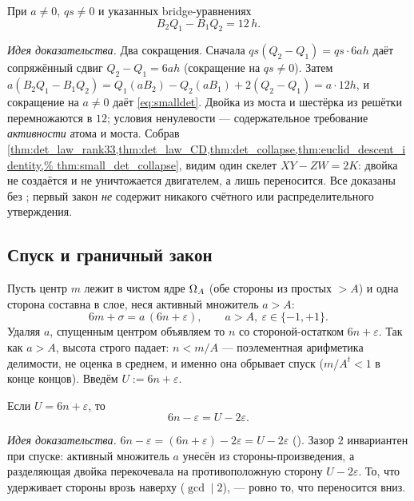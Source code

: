 \begin{theorem}\label{thm:small_det_collapse}
\green{} При $a\ne 0$, $qs\ne 0$ и указанных bridge-уравнениях
\begin{equation}\label{eq:smalldet}
B_2 Q_1-B_1 Q_2=12\,h.
\end{equation}
\end{theorem}

\emph{Идея доказательства.} Два сокращения. Сначала $qs(Q_2-Q_1)=qs\cdot 6ah$ даёт сопряжённый сдвиг
$Q_2-Q_1=6ah$ (сокращение на $qs\ne 0$). Затем
$a(B_2 Q_1-B_1 Q_2)=Q_1(aB_2)-Q_2(aB_1)+2(Q_2-Q_1)=a\cdot12h$, и сокращение на $a\ne 0$ даёт
\cref{eq:smalldet}. Двойка из моста и шестёрка из решётки перемножаются в $12$; условия ненулевости
--- содержательное требование \emph{активности} атома и моста. Собрав
\cref{thm:det_law_rank33,thm:det_law_CD,thm:det_collapse,thm:euclid_descent_identity,%
thm:small_det_collapse}, видим один скелет $XY-ZW=2K$: двойка не создаётся и не уничтожается
двигателем, а лишь переносится. Все доказаны без ; первый закон \emph{не} содержит
никакого счётного или распределительного утверждения.

\subsection{Спуск и граничный закон}

Пусть центр $m$ лежит в чистом ядре $\Omega_A$ (обе стороны из простых $>A$) и одна сторона составна в
слое, неся активный множитель $a>A$:
\begin{equation}\label{eq:descent-step}
6m+\sigma=a\,(6n+\varepsilon),\qquad a>A,\ \varepsilon\in\{-1,+1\}.
\end{equation}
Удаляя $a$, спущенным центром объявляем то $n$ со стороной-остатком $6n+\varepsilon$. Так как $a>A$,
высота строго падает: $n<m/A$ --- поэлементная арифметика делимости, не оценка в среднем, и именно
она обрывает спуск ($m/A^t<1$ в конце концов). Введём $U:=6n+\varepsilon$.

\begin{theorem}\label{thm:two_carry_opposite}
\green{} Если $U=6n+\varepsilon$, то
\begin{equation}\label{eq:two-carry}
6n-\varepsilon=U-2\varepsilon.
\end{equation}
\end{theorem}

\emph{Идея доказательства.} $6n-\varepsilon=(6n+\varepsilon)-2\varepsilon=U-2\varepsilon$
(). Зазор $2$ инвариантен при спуске: активный множитель $a$ унесён
из стороны-произведения, а разделяющая двойка перекочевала на противоположную сторону
$U-2\varepsilon$. То, что удерживает стороны врозь наверху ($\gcd\mid 2$), --- ровно то, что
переносится вниз.

